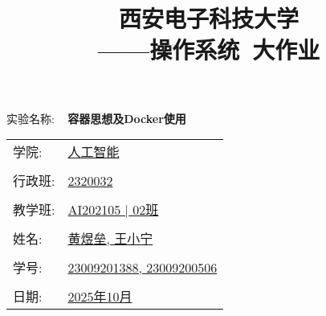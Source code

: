 \documentclass[UTF8]{ctexart}
\title{
    \Huge \textbf{西安电子科技大学} \\
    \vspace{0.5cm} 
    ——\LARGE 操作系统~大作业
}
\author{}
\date{}
\begin{document}


\maketitle

\begin{center}
    \Huge 实验名称: ~ \textbf{容器思想及Docker使用}
\end{center}

\vspace{1cm}

\begin{center}
    \Large
    \begin{tabular}{ll}
        学院: & \underline{人工智能}\\
        & \\
        行政班: & \underline{2320032}\\
        & \\
        教学班: & \underline{AI202105 | 02班}\\
        & \\
        姓名: & \underline{黄煜垒, 王小宁}\\
        & \\
        学号: & \underline{23009201388, 23009200506}\\
        & \\
        日期: & \underline{2025年10月}\\
    \end{tabular}
\end{center}

\newpage %

\tableofcontents %

\newpage %
\end{document}
